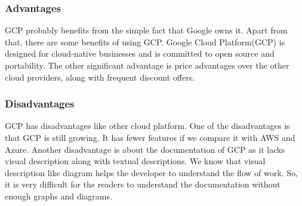 \subsubsection{Advantages}
%
GCP probably benefits from the simple fact that Google owns it. Apart from that, there are some benefits of using GCP. Google Cloud Platform(GCP) is designed for cloud-native businesses and is committed to open source and portability. The other significant advantage is price advantages over the other cloud providers, along with frequent discount offers. 


%
\subsubsection{Disadvantages}
%
GCP has disadvantages like other cloud platform. One of the disadvantages is that GCP is still growing. It has fewer features if we compare it with AWS and Azure. Another disadvantage is about the documentation of GCP as it lacks visual description along with textual descriptions\cite{inproceedingss}. We know that visual description like diagram helps the developer to understand the flow of work. So, it is very difficult for the readers to understand the documentation without enough graphs and diagrams.
%
